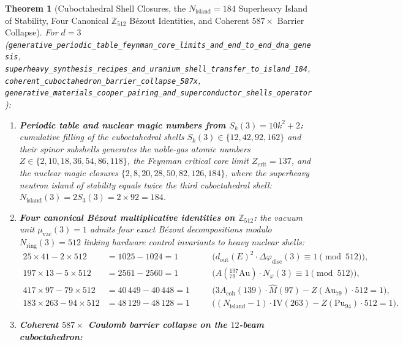 \documentclass[11pt,a4paper]{article}
\theoremstyle{plain}
\newtheorem{theorem}{Theorem}[section]
\theoremstyle{definition}
\begin{document}
\begin{theorem}[Cuboctahedral Shell Closures, the $N_{\mathrm{island}}=184$ Superheavy Island of Stability, Four Canonical $\mathbb{Z}_{512}$ B\'ezout Identities, and Coherent $587\times$ Barrier Collapse]
\label{thm:nuclear-587}
For $d=3$ (\texttt{generative\_periodic\_table\_feynman\_core\_limits\_and\_end\_to\_end\_dna\_genesis}, \texttt{superheavy\_synthesis\_recipes\_and\_uranium\_shell\_transfer\_to\_island\_184}, \texttt{coherent\_cuboctahedron\_barrier\_collapse\_587x}, \texttt{generative\_materials\_cooper\_pairing\_and\_superconductor\_shells\_operator}):
\begin{enumerate}[label=\textbf{(\roman*)},leftmargin=*]
\item \textbf{Periodic table and nuclear magic numbers from $S_k(3) = 10k^2 + 2$:}
  cumulative filling of the cuboctahedral shells $S_k(3)\in\{12,42,92,162\}$ and their spinor subshells generates the noble-gas atomic numbers $Z\in\{2,10,18,36,54,86,118\}$, the Feynman critical core limit $Z_{\mathrm{crit}} = 137$, and the nuclear magic closures $\{2,8,20,28,50,82,126,184\}$, where the superheavy neutron island of stability equals twice the third cuboctahedral shell: $N_{\mathrm{island}}(3) = 2S_3(3) = 2\times 92 = 184$.
\item \textbf{Four canonical B\'ezout multiplicative identities on $\mathbb{Z}_{512}$:}
  the vacuum unit $\mu_{\mathrm{vac}}(3) = 1$ admits four exact B\'ezout decompositions modulo $N_{\mathrm{ring}}(3) = 512$ linking hardware control invariants to heavy nuclear shells:
  \begin{equation}
    \label{eq:four-bezout-512}
    \begin{aligned}
      25\times 41 - 2\times 512 &= 1025 - 1024 = 1 &\quad &\bigl(d_{\mathrm{out}}(E)^2\cdot\Delta\varphi_{\mathrm{disc}}(3) \equiv 1\pmod{512}\bigr), \\
      197\times 13 - 5\times 512 &= 2561 - 2560 = 1 &\quad &\bigl(A(^{197}_{79}\mathrm{Au})\cdot N_\varphi(3) \equiv 1\pmod{512}\bigr), \\
      417\times 97 - 79\times 512 &= 40\,449 - 40\,448 = 1 &\quad &\bigl(3 A_{\mathrm{coh}}(139)\cdot\hat{M}(97) - Z(\mathrm{Au}_{79})\cdot 512 = 1\bigr), \\
      183\times 263 - 94\times 512 &= 48\,129 - 48\,128 = 1 &\quad &\bigl((N_{\mathrm{island}}-1)\cdot\mathrm{IV}(263) - Z(\mathrm{Pu}_{94})\cdot 512 = 1\bigr).
    \end{aligned}
  \end{equation}
\item \textbf{Coherent $587\times$ Coulomb barrier collapse on the $12$-beam cuboctahedron:}

\end{enumerate}
\end{theorem}
\end{document}
